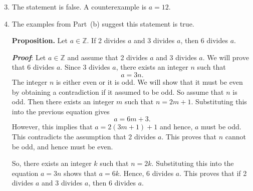 \documentclass[11pt]{article}
\begin{document}
\begin{enumerate} \setcounter{enumi}{2}
\item The statement is false.  A counterexample is $a = 12$.
\item The examples from Part~(b) suggest this statement is true.

\newpar
\textbf{Proposition.}
Let  $a \in \mathbb{Z}$.  If  2  divides  $a$  and  3  divides  $a$, then  6  divides  $a$.

\noindent
\textbf{\emph{Proof}}:  Let  $a \in \mathbb{Z}$ and assume that  2  divides  $a$  and  3  divides  $a$.  We will prove that  6 divides  $a$.  Since  3  divides  $a$, there exists an integer  $n$  such that
\[
a = 3n.
\]
The integer  $n$  is either even or it is odd.  We will show that it must be even by obtaining a contradiction if it assumed to be odd.  So assume that  $n$  is odd. Then there exists an integer $m$ such that  $n = 2m + 1$.  Substituting this into the previous equation gives
\[
a = 6m + 3.
\]
However, this implies that $a = 2 \left( 3m + 1 \right) + 1$ and hence, $a$ must be odd.  This contradicts the assumption that 2 divides $a$.  This proves that $n$ cannot be odd, and hence must be even.

So, there exists an integer $k$ such that $n = 2k$.  Substituting this into the equation $a = 3n$ shows that $a = 6k$.  Hence, 6 divides $a$.  This proves that if 2 divides $a$ and 3 divides $a$, then 6 divides $a$. \qedsymbol
\end{enumerate}
\end{document}
